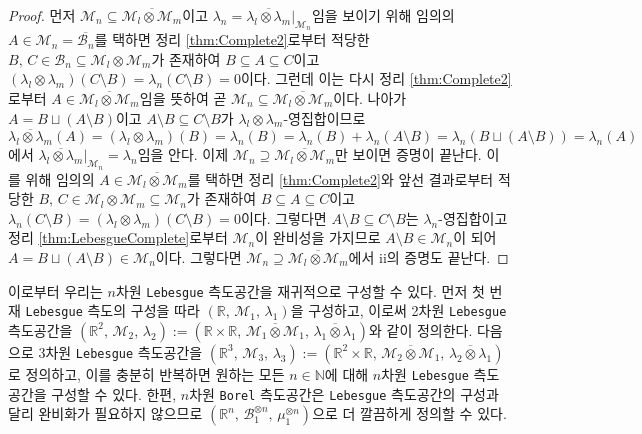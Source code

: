 \begin{proof}
    먼저 $\mathcal{M}_n\subseteq\overline{\mathcal{M}_l\otimes\mathcal{M}_m}$이고 $\lambda_n=\overline{\lambda_l\otimes\lambda_m}\vert_{\mathcal{M}_n}$임을 보이기 위해 임의의 $A\in\mathcal{M}_n=\overline{\mathcal{B}_n}$를 택하면 정리 \ref{thm:Complete2}로부터 적당한 $B,\,C\in\mathcal{B}_n\subseteq\mathcal{M}_l\otimes\mathcal{M}_m$가 존재하여 $B\subseteq A\subseteq C$이고 $(\lambda_l\otimes\lambda_m)(C\setminus B)=\lambda_n(C\setminus B)=0$이다. 그런데 이는 다시 정리 \ref{thm:Complete2}로부터 $A\in\overline{\mathcal{M}_l\otimes\mathcal{M}_m}$임을 뜻하여 곧 $\mathcal{M}_n\subseteq\overline{\mathcal{M}_l\otimes\mathcal{M}_m}$이다. 나아가 $A=B\sqcup(A\setminus B)$이고 $A\setminus B\subseteq C\setminus B$가 $\lambda_l\otimes\lambda_m$-영집합이므로 $\overline{\lambda_l\otimes\lambda_m}(A)=(\lambda_l\otimes\lambda_m)(B)=\lambda_n(B)=\lambda_n(B)+\lambda_n(A\setminus B)=\lambda_n(B\sqcup(A\setminus B))=\lambda_n(A)$에서 $\overline{\lambda_l\otimes\lambda_m}\vert_{\mathcal{M}_n}=\lambda_n$임을 안다. 이제 $\mathcal{M}_n\supseteq\overline{\mathcal{M}_l\otimes\mathcal{M}_m}$만 보이면 증명이 끝난다. 이를 위해 임의의 $A\in\overline{\mathcal{M}_l\otimes\mathcal{M}_m}$를 택하면 정리 \ref{thm:Complete2}와 앞선 결과로부터 적당한 $B,\,C\in\mathcal{M}_l\otimes\mathcal{M}_m\subseteq\mathcal{M}_n$가 존재하여 $B\subseteq A\subseteq C$이고 $\lambda_n(C\setminus B)=(\lambda_l\otimes\lambda_m)(C\setminus B)=0$이다. 그렇다면 $A\setminus B\subseteq C\setminus B$는 $\lambda_n$-영집합이고 정리 \ref{thm:LebesgueComplete}로부터 $\mathcal{M}_n$이 완비성을 가지므로 $A\setminus B\in\mathcal{M}_n$이 되어 $A=B\sqcup(A\setminus B)\in\mathcal{M}_n$이다. 그렇다면 $\mathcal{M}_n\supseteq\overline{\mathcal{M}_l\otimes\mathcal{M}_m}$에서 ii의 증명도 끝난다.
\end{proof}

이로부터 우리는 $n$차원 \texttt{Lebesgue} 측도공간을 재귀적으로 구성할 수 있다. 먼저 첫 번재 \texttt{Lebesgue} 측도의 구성을 따라 $(\mathbb{R},\,\mathcal{M}_1,\,\lambda_1)$을 구성하고, 이로써 2차원 \texttt{Lebesgue} 측도공간을 $(\mathbb{R}^2,\,\mathcal{M}_2,\,\lambda_2):=(\mathbb{R}\times\mathbb{R},\,\overline{\mathcal{M}_1\otimes\mathcal{M}_1},\,\overline{\lambda_1\otimes\lambda_1})$와 같이 정의한다. 다음으로 3차원 \texttt{Lebesgue} 측도공간을 $(\mathbb{R}^3,\,\mathcal{M}_3,\,\lambda_3):=(\mathbb{R}^2\times\mathbb{R},\,\overline{\mathcal{M}_2\otimes\mathcal{M}_1},\,\overline{\lambda_2\otimes\lambda_1})$로 정의하고, 이를 충분히 반복하면 원하는 모든 $n\in\mathbb{N}$에 대해 $n$차원 \texttt{Lebesgue} 측도공간을 구성할 수 있다. 한편, $n$차원 \texttt{Borel} 측도공간은 \texttt{Lebesgue} 측도공간의 구성과 달리 완비화가 필요하지 않으므로 $(\mathbb{R}^n,\,\mathcal{B}_1^{\otimes n},\,\mu_1^{\otimes n})$으로 더 깔끔하게 정의할 수 있다.

